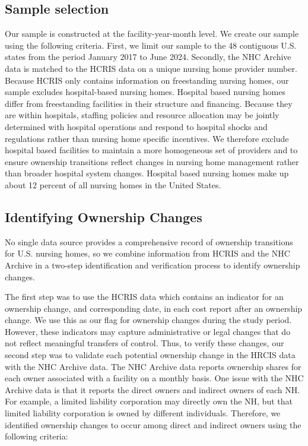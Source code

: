 \documentclass[preprint,authoryear]{elsarticle}
\begin{document}
\subsection{Sample selection}

Our sample is constructed at the facility-year-month level. We create our sample using the following criteria. First, we limit our sample to the 48 contiguous U.S. states from the period January 2017 to June 2024. Secondly, the NHC Archive data is matched to the HCRIS data on a unique nursing home provider number. Because HCRIS only contains information on freestanding nursing homes, our sample excludes hospital-based nursing homes. Hospital based nursing homes differ from freestanding facilities in their structure and financing. Because they are within hospitals, staffing policies and resource allocation may be jointly determined with hospital operations and respond to hospital shocks and regulations rather than nursing home specific incentives. We therefore exclude hospital based facilities to maintain a more homogeneous set of providers and to ensure ownership transitions reflect changes in nursing home management rather than broader hospital system changes.  Hospital based nursing homes make up about 12 percent of all nursing homes in the United States. 


\subsection{Identifying Ownership Changes}

No single data source provides a comprehensive record of ownership transitions for U.S. nursing homes, so we combine information from HCRIS and the NHC Archive in a two-step identification and verification process to identify ownership changes.

The first step was to use the HCRIS data which contains an indicator for an ownership change, and corresponding date, in each cost report after an ownership change. We use this as our flag for ownership changes during the study period. However, these indicators may capture administrative or legal changes that do not reflect meaningful transfers of control. Thus, to verify these changes, our second step was to validate each potential ownership change in the HRCIS data with the NHC Archive data. The NHC Archive data reports ownership shares for each owner associated with a facility on a monthly basis. One issue with the NHC Archive data is that it reports the direct owners and indirect owners of each NH. For example, a limited liability corporation may directly own the NH, but that limited liability corporation is owned by different individuals. Therefore, we identified ownership changes to occur among direct and indirect owners using the following criteria: 
\end{document}
